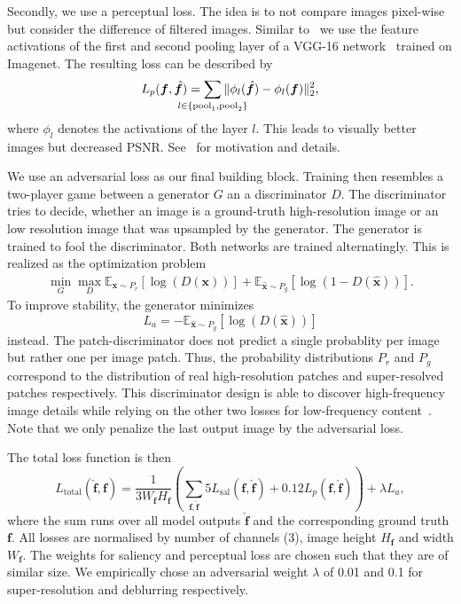 \documentclass{scrartcl}
\newcommand{\img}{\bm{f}} %
\begin{document}
Secondly, we use a perceptual loss.
The idea is to not compare images pixel-wise but consider the difference of filtered images.
Similar to~\cite{PerceptualLoss} we use the feature activations of the first and second pooling layer of a VGG-16 network~\cite{Vgg} trained on Imagenet.
The resulting loss can be described by
\begin{equation}
  \label{eq:perceptual-loss}
  L_p(\img, \hat{\img}) = \sum_{\mathclap{l \in \{ \text{pool}_1, \text{pool}_2 \}}} \Vert \phi_l( \hat{\img} ) - \phi_l (\img) \Vert_2^2,
\end{equation}
where \(\phi_l\) denotes the activations of the layer \(l\).
This leads to visually better images but decreased PSNR.
See~\cite{PerceptualLoss} for motivation and details.

We use an adversarial loss as our final building block.
Training then resembles a two-player game between a generator \(G\) an a discriminator \(D\).
The discriminator tries to decide, whether an image is a ground-truth high-resolution image or an low resolution image that was upsampled by the generator.
The generator is trained to fool the discriminator.
Both networks are trained alternatingly.
This is realized as the optimization problem~\cite{GAN}
\begin{align}
 \min_G \max_D \mathbb{E}_{\bm{x} \sim P_r} \left[ \log (D({\bm{x}})) \right] +
  \mathbb{E}_{\hat{\bm{x}} \sim P_g} \left[  \log (1 - D(\hat{\bm{x}})) \right].
\end{align}
To improve stability, the generator minimizes
\begin{equation}
  L_a = - \mathbb{E}_{\hat{\bm{x}} \sim P_g} \left[ \log (D(\hat{\bm{x}})) \right]
\end{equation}
instead.
The patch-discriminator does not predict a single probablity per image but rather one per image patch.
Thus, the probability distributions $P_r$ and $P_g$ correspond to the distribution of real high-resolution patches and super-resolved patches respectively.
This discriminator design is able to discover high-frequency image details while relying on the other two losses for low-frequency content~\cite{PatchGAN}.
Note that we only penalize the last output image by the adversarial loss.

The total loss function is then
\begin{equation}
  \label{eq:total-loss}
L_\text{total}(\hat{\img}, \img) = \frac{1}{3 W_{\img} H_{\img}}
\left( \sum_{\img, \hat{\img}}
  5 L_{\text{sal}} (\img, \hat{\img}) + 0.12  L_p(\img, \hat{\img}) \right) + \lambda L_a,
\end{equation}
where the sum runs over all model outputs \(\hat{\img}\) and the corresponding ground truth \(\img\).
All losses are normalised by number of channels (3), image height \(H_{\img}\) and width \(W_{\img}\).
The weights for saliency and perceptual loss are chosen such that they are of similar size.
We empirically chose an adversarial weight $\lambda$ of 0.01 and 0.1 for super-resolution and deblurring respectively.
\end{document}

